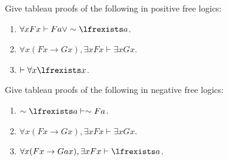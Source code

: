 \documentclass[../../../include/open-logic-section]{subfiles}
\begin{document}



\begin{prob}
Give tableau proofs of the following in positive free logics:
\begin{enumerate}
\item $\forall xFx\vdash Fa\lor\sim \lfrexists a$.
\item $\forall x(Fx\rightarrow Gx),\exists xFx\vdash\exists xGx$. %
\item $\vdash\forall x\lfrexists x$.
\end{enumerate}
\end{prob}

\begin{prob}
Give tableau proofs of the following in negative free logics:
\begin{enumerate}
\item $\sim \lfrexists a\vdash\sim Fa$.
\item $\forall x(Fx\rightarrow Gx),\exists xFx\vdash\exists xGx$.
\item $\forall x(Fx\rightarrow Gax),\exists xFx\vdash \lfrexists a$.
\end{enumerate}
\end{prob}
\end{document}

